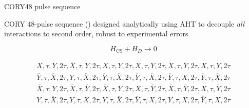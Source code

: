 \documentclass{beamer}
\begin{document}
\begin{frame}{CORY48 pulse sequence}
%

CORY 48-pulse sequence (\cite{CORY1990205}) designed analytically using AHT to decouple \emph{all} interactions to second order, robust to experimental errors

\[
H_{\text{CS}} + H_D \longrightarrow 0
\]

\begin{equation*}\label{eq:CORY48}
\begin{aligned}
    X, \tau, Y, 2\tau, \overline{X}, \tau, Y, 2\tau, X, \tau, Y, 2\tau,
    X, \tau, Y, 2\tau, X, \tau, \overline{Y}, 2\tau, X, \tau, Y, 2\tau \\
    \overline{Y}, \tau, \overline{X}, 2\tau, Y, \tau, \overline{X}, 2\tau,
    \overline{Y}, \tau, \overline{X}, 2\tau, \overline{Y}, \tau, \overline{X},
    2\tau, \overline{Y}, \tau, X, 2\tau, \overline{Y}, \tau, \overline{X},
    2\tau \\
    \overline{X}, \tau, Y, 2\tau, \overline{X}, \tau, \overline{Y}, 2\tau,
    \overline{X}, \tau, Y, 2\tau, X, \tau, \overline{Y}, 2\tau, \overline{X},
    \tau, \overline{Y}, 2\tau, X, \tau, \overline{Y}, 2\tau \\
    Y, \tau, \overline{X}, 2\tau, Y, \tau, X, 2\tau, Y, \tau, \overline{X}, 2\tau, \overline{Y}, \tau, X, 2\tau, Y, \tau, X, 2\tau, \overline{Y}, \tau, X, 2\tau
\end{aligned}
\end{equation*}

\end{frame}
\end{document}

